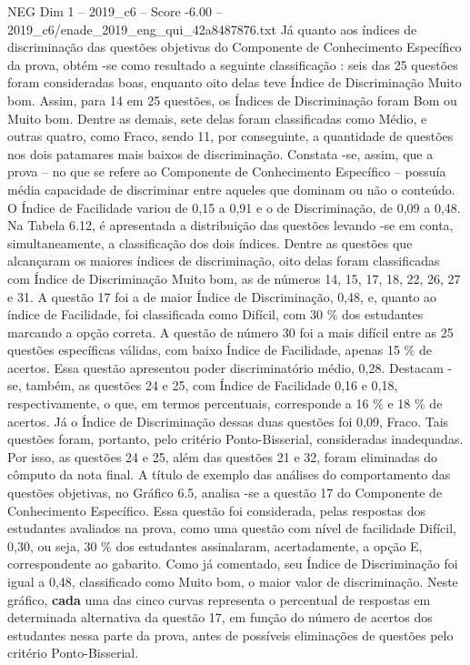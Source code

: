 \begin{textsample}{NEG Dim 1 – 2019\_c6 – Score -6.00 – 2019\_c6/enade\_2019\_eng\_qui\_42a8487876.txt}
Já quanto aos índices de discriminação das questões objetivas do Componente de Conhecimento Específico da prova, obtém -se como resultado a seguinte classificação : seis das 25 questões foram consideradas boas, enquanto oito delas teve Índice de Discriminação Muito bom.
Assim, para 14 em 25 questões, os Índices de Discriminação foram Bom ou Muito bom.
Dentre as demais, sete delas foram classificadas como Médio, e outras quatro, como Fraco, sendo 11, por conseguinte, a quantidade de questões nos dois patamares mais baixos de discriminação.
Constata -se, assim, que a prova – no que se refere ao Componente de Conhecimento Específico – possuía média capacidade de discriminar entre aqueles que dominam ou não o conteúdo.
O Índice de Facilidade variou de 0,15 a 0,91 e o de Discriminação, de 0,09 a 0,48.
Na Tabela 6.12, é apresentada a distribuição das questões levando -se em conta, simultaneamente, a classificação dos dois índices.
Dentre as questões que alcançaram os maiores índices de discriminação, oito delas foram classificadas com Índice de Discriminação Muito bom, as de números 14, 15, 17, 18, 22, 26, 27 e 31.
A questão 17 foi a de maior Índice de Discriminação, 0,48, e, quanto ao índice de Facilidade, foi classificada como Difícil, com 30 \% dos estudantes marcando a opção correta.
A questão de número 30 foi a mais difícil entre as 25 questões específicas válidas, com baixo Índice de Facilidade, apenas 15 \% de acertos.
Essa questão apresentou poder discriminatório médio, 0,28.
Destacam -se, também, as questões 24 e 25, com Índice de Facilidade 0,16 e 0,18, respectivamente, o que, em termos percentuais, corresponde a 16 \% e 18 \% de acertos.
Já o Índice de Discriminação dessas duas questões foi 0,09, Fraco.
Tais questões foram, portanto, pelo critério Ponto-Bisserial, consideradas inadequadas.
Por isso, as questões 24 e 25, além das questões 21 e 32, foram eliminadas do cômputo da nota final.
A título de exemplo das análises do comportamento das questões objetivas, no Gráfico 6.5, analisa -se a questão 17 do Componente de Conhecimento Específico.
Essa questão foi considerada, pelas respostas dos estudantes avaliados na prova, como uma questão com nível de facilidade Difícil, 0,30, ou seja, 30 \% dos estudantes assinalaram, acertadamente, a opção E, correspondente ao gabarito.
Como já comentado, seu Índice de Discriminação foi igual a 0,48, classificado como Muito bom, o maior valor de discriminação.
Neste gráfico, \textbf{cada} uma das cinco curvas representa o percentual de respostas em determinada alternativa da questão 17, em função do número de acertos dos estudantes nessa parte da prova, antes de possíveis eliminações de questões pelo critério Ponto-Bisserial.

\end{textsample}
